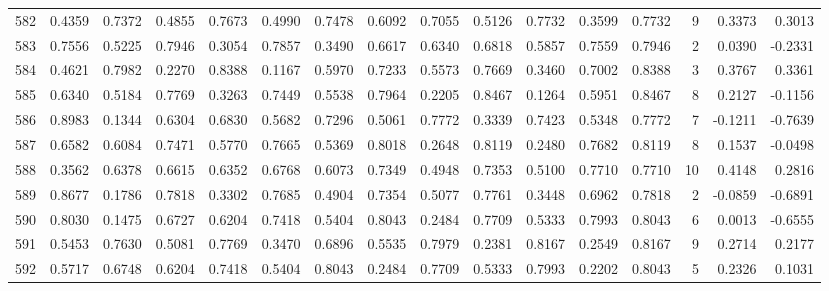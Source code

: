 \begin{tabular}{lrrrrrrrrrrrrrrr}
582 &      0.4359 &  0.7372 &  0.4855 &  0.7673 &  0.4990 &  0.7478 &  0.6092 &  0.7055 &  0.5126 &  0.7732 &   0.3599 &     0.7732 &      9 &                    0.3373 &                     0.3013 \\
583 &      0.7556 &  0.5225 &  0.7946 &  0.3054 &  0.7857 &  0.3490 &  0.6617 &  0.6340 &  0.6818 &  0.5857 &   0.7559 &     0.7946 &      2 &                    0.0390 &                    -0.2331 \\
584 &      0.4621 &  0.7982 &  0.2270 &  0.8388 &  0.1167 &  0.5970 &  0.7233 &  0.5573 &  0.7669 &  0.3460 &   0.7002 &     0.8388 &      3 &                    0.3767 &                     0.3361 \\
585 &      0.6340 &  0.5184 &  0.7769 &  0.3263 &  0.7449 &  0.5538 &  0.7964 &  0.2205 &  0.8467 &  0.1264 &   0.5951 &     0.8467 &      8 &                    0.2127 &                    -0.1156 \\
586 &      0.8983 &  0.1344 &  0.6304 &  0.6830 &  0.5682 &  0.7296 &  0.5061 &  0.7772 &  0.3339 &  0.7423 &   0.5348 &     0.7772 &      7 &                   -0.1211 &                    -0.7639 \\
587 &      0.6582 &  0.6084 &  0.7471 &  0.5770 &  0.7665 &  0.5369 &  0.8018 &  0.2648 &  0.8119 &  0.2480 &   0.7682 &     0.8119 &      8 &                    0.1537 &                    -0.0498 \\
588 &      0.3562 &  0.6378 &  0.6615 &  0.6352 &  0.6768 &  0.6073 &  0.7349 &  0.4948 &  0.7353 &  0.5100 &   0.7710 &     0.7710 &     10 &                    0.4148 &                     0.2816 \\
589 &      0.8677 &  0.1786 &  0.7818 &  0.3302 &  0.7685 &  0.4904 &  0.7354 &  0.5077 &  0.7761 &  0.3448 &   0.6962 &     0.7818 &      2 &                   -0.0859 &                    -0.6891 \\
590 &      0.8030 &  0.1475 &  0.6727 &  0.6204 &  0.7418 &  0.5404 &  0.8043 &  0.2484 &  0.7709 &  0.5333 &   0.7993 &     0.8043 &      6 &                    0.0013 &                    -0.6555 \\
591 &      0.5453 &  0.7630 &  0.5081 &  0.7769 &  0.3470 &  0.6896 &  0.5535 &  0.7979 &  0.2381 &  0.8167 &   0.2549 &     0.8167 &      9 &                    0.2714 &                     0.2177 \\
592 &      0.5717 &  0.6748 &  0.6204 &  0.7418 &  0.5404 &  0.8043 &  0.2484 &  0.7709 &  0.5333 &  0.7993 &   0.2202 &     0.8043 &      5 &                    0.2326 &                     0.1031 \\

\end{tabular}
